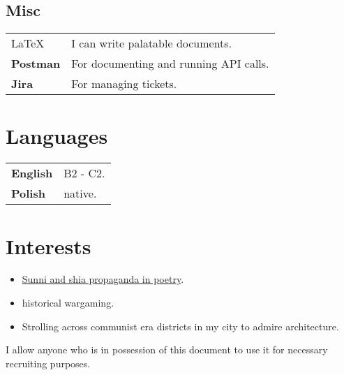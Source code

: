 \documentclass[10pt]{article}
\begin{document}
\subsection{Misc}
\begin{table}[H]
        \begin{tabularx}{\textwidth}{@{}l X}
         \LaTeX & I can write palatable documents. \\
         \textbf{Postman} & For documenting and running API calls.  \\
         \textbf{Jira} & For managing tickets.  \\
\end{tabularx}
\end{table}
\section{Languages}
\begin{table}[H]
        \begin{tabularx}{\textwidth}{@{}l X}
         \bfseries English & B2 - C2. \\
         \bfseries Polish & native.  \\
\end{tabularx}
\end{table}
\section{Interests}
\begin{itemize}
    \item \href{http://cejsh.icm.edu.pl/cejsh/element/bwmeta1.element.desklight-b5b6fec4-8161-42ac-9a31-c0e6c344f9fa}{Sunni and shia propaganda in poetry}.
    \item historical wargaming.
    \item Strolling across communist era districts in my city to admire architecture.
\end{itemize}
\vfill
\begin{center}
I allow anyone who is in possession of this document to use it for necessary recruiting purposes.
\end{center}
\end{document}
